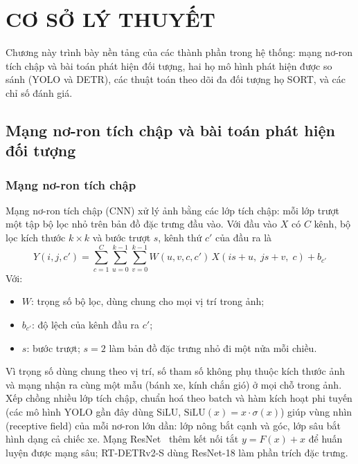 \chapter{CƠ SỞ LÝ THUYẾT}
\label{chap:lythuyet}

Chương này trình bày nền tảng của các thành phần trong hệ thống: mạng nơ-ron tích chập và bài toán phát hiện đối
tượng, hai họ mô hình phát hiện được so sánh (YOLO và DETR), các thuật toán theo dõi đa đối tượng họ SORT, và các chỉ
số đánh giá.

\section{Mạng nơ-ron tích chập và bài toán phát hiện đối tượng}

\subsection{Mạng nơ-ron tích chập}

Mạng nơ-ron tích chập (CNN) xử lý ảnh bằng các lớp tích chập: mỗi lớp trượt một tập bộ lọc nhỏ trên bản đồ đặc trưng
đầu vào. Với đầu vào $X$ có $C$ kênh, bộ lọc kích thước $k \times k$ và bước trượt $s$, kênh thứ $c'$ của đầu ra là
\begin{equation}
  Y(i, j, c') = \sum_{c=1}^{C} \sum_{u=0}^{k-1} \sum_{v=0}^{k-1} W(u, v, c, c')\, X(i s + u,\; j s + v,\; c) + b_{c'}
  \label{eq:conv}
\end{equation}
Với:
\begin{itemize}
  \item $W$: trọng số bộ lọc, dùng chung cho mọi vị trí trong ảnh;
  \item $b_{c'}$: độ lệch của kênh đầu ra $c'$;
  \item $s$: bước trượt; $s = 2$ làm bản đồ đặc trưng nhỏ đi một nửa mỗi chiều.
\end{itemize}

Vì trọng số dùng chung theo vị trí, số tham số không phụ thuộc kích thước ảnh và mạng nhận ra cùng một mẫu (bánh xe,
kính chắn gió) ở mọi chỗ trong ảnh. Xếp chồng nhiều lớp tích chập, chuẩn hoá theo batch và hàm kích hoạt phi tuyến (các
mô hình YOLO gần đây dùng SiLU, $\mathrm{SiLU}(x) = x \cdot \sigma(x)$) giúp vùng nhìn (receptive field) của mỗi nơ-ron
lớn dần: lớp nông bắt cạnh và góc, lớp sâu bắt hình dạng cả chiếc xe. Mạng ResNet~\cite{he2016resnet} thêm kết nối tắt
$y = F(x) + x$ để huấn luyện được mạng sâu; RT-DETRv2-S dùng ResNet-18 làm phần trích đặc trưng.

